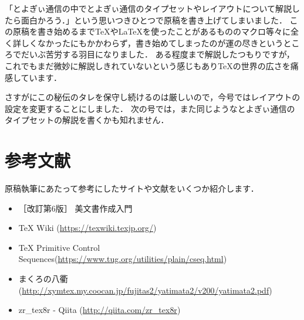 「とよぎぃ通信の中でとよぎぃ通信のタイプセットやレイアウトについて解説したら面白かろう．」という思いつきひとつで原稿を書き上げてしまいました．
この原稿を書き始めるまで{\TeX}や{\LaTeX}を使ったことがあるもののマクロ等々に全く詳しくなかったにもかかわらず，書き始めてしまったのが運の尽きというところでだいぶ苦労する羽目になりました．
ある程度まで解説したつもりですが，これでもまだ微妙に解説しきれていないという感じもあり{\TeX}の世界の広さを痛感しています．

さすがにこの秘伝のタレを保守し続けるのは厳しいので，今号ではレイアウトの設定を変更することにしました．
次の号では，また同じようなとよぎぃ通信のタイプセットの解説を書くかも知れません．

\section*{参考文献}

原稿執筆にあたって参考にしたサイトや文献をいくつか紹介します．

\begin{itemize}
	\item ［改訂第6版］ {\LaTeXe} 美文書作成入門
	\item TeX Wiki (\url{https://texwiki.texjp.org/})
	\item TeX Primitive Control Sequences(\url{https://www.tug.org/utilities/plain/cseq.html})
	\item {\LaTeXe}まくろの八衢 (\url{http://xymtex.my.coocan.jp/fujitas2/yatimata2/v200/yatimata2.pdf})
	\item zr\_tex8r - Qiita (\url{http://qiita.com/zr_tex8r})
\end{itemize}
